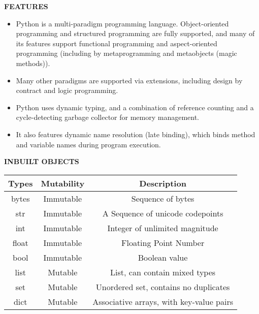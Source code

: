 \documentclass{beamer}
\begin{document}
\begin{darkframes}
    \begin{frame}{\textbf{FEATURES}}
    \begin{itemize}
        \item Python is a multi-paradigm programming language. Object-oriented programming and structured programming are fully supported, and many of its features support functional programming and aspect-oriented programming (including by metaprogramming and metaobjects (magic methods)).
        \item Many other paradigms are supported via extensions, including design by contract and logic programming.
        \item Python uses dynamic typing, and a combination of reference counting and a cycle-detecting garbage collector for memory management. \item It also features dynamic name resolution (late binding), which binds method and variable names during program execution.
    \end{itemize}
    \end{frame}
    
    \begin{frame}{\textbf{INBUILT OBJECTS}}
    \begin{tabular}{|c|c|c|}
        \hline
        \textbf{Types} & \textbf{Mutability} & \textbf{Description}\\
        \hline
         bytes & Immutable & Sequence of bytes\\
         \hline
         str & Immutable & A Sequence of unicode codepoints \\
         \hline
         int & Immutable & Integer of unlimited magnitude\\
         \hline
         float & Immutable & Floating Point Number\\
         \hline
         bool & Immutable & Boolean value\\
         \hline
         list & Mutable & List, can contain mixed types\\
         \hline
         set & Mutable& Unordered set, contains no duplicates\\
         \hline
         dict & Mutable& Associative arrays, with key-value pairs\\
         \hline
    \end{tabular}
    
    \end{frame}
    

\end{darkframes}
\end{document}
